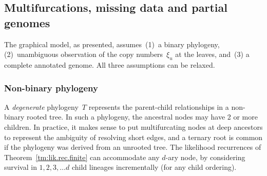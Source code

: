 \documentclass{elsarticle}
\newcommand{\nx}{u}
\begin{document}
\subsection{Multifurcations, missing data and partial genomes}
The graphical model, as presented, assumes~(1)~a binary phylogeny, 
(2)~unambiguous observation of the copy numbers~$\xi_{\nx}$ at the leaves, 
and~(3) a complete annotated genome. All three assumptions can be relaxed.   
\subsubsection*{Non-binary phylogeny}
A {\em degenerate} phylogeny~$T$ represents the parent-child 
relationships in a non-binary rooted tree. 
In such a phylogeny, the ancestral nodes may have 2 or more children. In practice, 
it makes sense to put multifurcating nodes at deep ancestors to represent the 
ambiguity of resolving short edges, and a ternary root is common
if the phylogeny was derived from an unrooted tree.
The likelihood recurrences of Theorem~\ref{tm:lik.rec.finite} can accommodate 
any $d$-ary node, by considering survival in $1,2,3,\dotsc d$ 
child lineages incrementally (for any child ordering). 
\end{document}
